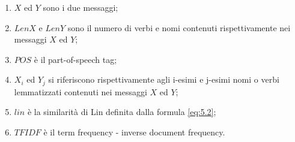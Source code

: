 \begin{enumerate}[label=(\roman*)]
  
\item \( X \) ed \( Y \) sono i due messaggi;
\item \( LenX \) e \( LenY \) sono il numero di verbi e nomi contenuti rispettivamente nei messaggi \( X \) ed \( Y \);
\item \( POS \) {\`e} il part-of-speech tag;
\item \( X_{i} \) ed \( Y_{j} \) si riferiscono rispettivamente agli i-esimi e j-esimi nomi o verbi lemmatizzati contenuti nei messaggi \( X \) ed \( Y \);
\item \( lin \) {\`e} la similarit{\`a} di Lin definita dalla formula \eqref{eq:5.2};
\item \( TFIDF \) {\`e} il term frequency - inverse document frequency.

\end{enumerate}
